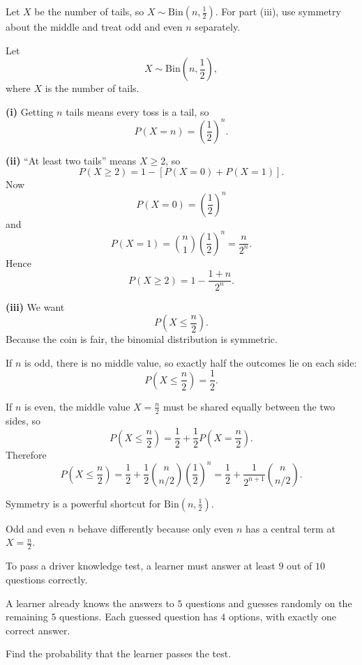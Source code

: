 \begin{hint}
Let $X$ be the number of tails, so $X\sim \mathrm{Bin}\left(n,\frac12\right)$. For part (iii), use symmetry about the middle and treat odd and even $n$ separately.
\end{hint}

\begin{solution}
Let
\[
X\sim \mathrm{Bin}\left(n,\frac12\right),
\]
where $X$ is the number of tails.

\textbf{(i)} Getting $n$ tails means every toss is a tail, so
\[
P(X=n)=\left(\frac12\right)^n.
\]

\textbf{(ii)} ``At least two tails'' means $X\ge 2$, so
\[
P(X\ge 2)=1-[P(X=0)+P(X=1)].
\]
Now
\[
P(X=0)=\left(\frac12\right)^n
\]
and
\[
P(X=1)=\binom n1 \left(\frac12\right)^n = \frac{n}{2^n}.
\]
Hence
\[
P(X\ge 2)=1-\frac{1+n}{2^n}.
\]

\textbf{(iii)} We want
\[
P\left(X\le \frac n2\right).
\]
Because the coin is fair, the binomial distribution is symmetric.

If $n$ is odd, there is no middle value, so exactly half the outcomes lie on each side:
\[
P\left(X\le \frac n2\right)=\frac12.
\]

If $n$ is even, the middle value $X=\frac n2$ must be shared equally between the two sides, so
\[
P\left(X\le \frac n2\right)=\frac12+\frac12 P\left(X=\frac n2\right).
\]
Therefore
\[
P\left(X\le \frac n2\right)=\frac12+\frac12\binom{n}{n/2}\left(\frac12\right)^n
=\frac12+\frac{1}{2^{n+1}}\binom{n}{n/2}.
\]
\end{solution}

\begin{takeaways}
\item Symmetry is a powerful shortcut for $\mathrm{Bin}\!\left(n,\frac12\right)$.
\item Odd and even $n$ behave differently because only even $n$ has a central term at $X=\frac n2$.
\end{takeaways}

\begin{problem}
To pass a driver knowledge test, a learner must answer at least $9$ out of $10$ questions correctly.

A learner already knows the answers to $5$ questions and guesses randomly on the remaining $5$ questions. Each guessed question has $4$ options, with exactly one correct answer.

Find the probability that the learner passes the test.
\end{problem}

